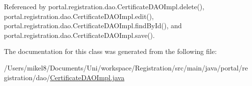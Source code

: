 Referenced by portal.registration.dao.CertificateDAOImpl.delete(), portal.registration.dao.CertificateDAOImpl.edit(), portal.registration.dao.CertificateDAOImpl.findById(), and portal.registration.dao.CertificateDAOImpl.save().



The documentation for this class was generated from the following file:\begin{DoxyCompactItemize}
\item 
/Users/mikel8/Documents/Uni/workspace/Registration/src/main/java/portal/registration/dao/\hyperlink{CertificateDAOImpl_8java}{CertificateDAOImpl.java}\end{DoxyCompactItemize}
